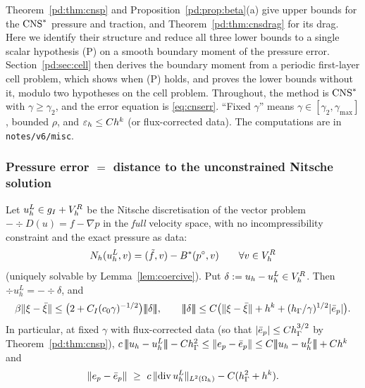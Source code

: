 Theorem~\ref{pd:thm:cnsp} and Proposition~\ref{pd:prop:beta}(a) give upper bounds for the $\mathrm{CNS}^\ast$ pressure and traction, and Theorem~\ref{pd:thm:cnsdrag} for its drag. Here we identify their structure and reduce all three lower bounds to a single scalar hypothesis (P) on a smooth boundary moment of the pressure error. Section~\ref{pd:sec:cell} then derives the boundary moment from a periodic first-layer cell problem, which shows when (P) holds, and proves the lower bounds without it, modulo two hypotheses on the cell problem. Throughout, the method is $\mathrm{CNS}^\ast$ with $\gamma\ge\gamma_2$, and the error equation is \eqref{eq:cnserr}. ``Fixed $\gamma$'' means $\gamma\in[\gamma_2,\gamma_{\max}]$, bounded $\rho$, and $\varepsilon_h\le Ch^k$ (or flux-corrected data). The computations are in \texttt{notes/v6/misc}.

\subsubsection{Pressure error $=$ distance to the unconstrained Nitsche solution}

\begin{proposition}\label{pd:prop:A1}
Let $u_h^L\in g_I+V_h^R$ be the Nitsche discretisation of the vector problem $-\div D(u)=f-\nabla p$ in the \emph{full} velocity space, with no incompressibility constraint and the exact pressure as data:
\[
N_h(u_h^L,v)=(\tilde f,v)-B^\ast(p^\circ,v)\qquad\forall v\in V_h^R
\]
(uniquely solvable by Lemma~\ref{lem:coercive}). Put $\delta:=u_h-u_h^L\in V_h^R$. Then $\div u_h^L=-\div\delta$, and
\[
\beta\norm{\xi-\bar\xi}\le\bigl(2+C_I(c_0\gamma)^{-1/2}\bigr)\tnorm\delta,\qquad
\tnorm\delta\le C\bigl(\norm{\xi-\bar\xi}+h^k+(\hG/\gamma)^{1/2}|\bar e_p|\bigr).
\]
In particular, at fixed $\gamma$ with flux-corrected data (so that $|\bar e_p|\le Ch_\Gamma^{3/2}$ by Theorem~\ref{pd:thm:cnsp}), $c\,\tnorm{u_h-u_h^L}-C\hG^2\le\norm{e_p-\bar e_p}\le C\tnorm{u_h-u_h^L}+Ch^k$ and
\[
\lVert e_p-\bar e_p\rVert\ \ge\ c\,\lVert \operatorname{div} u_h^L\rVert_{L^2(\Omega_h)}-C(h_\Gamma^2+h^k).
\]
\end{proposition}

